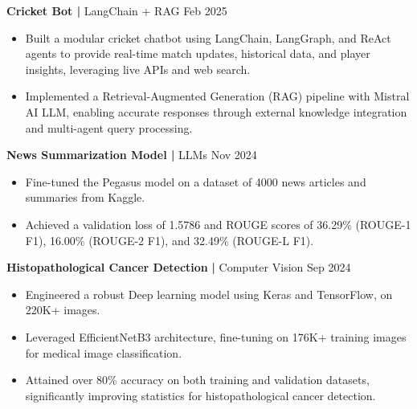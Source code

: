\documentclass{article}
\begin{document}
{{%
 \large { \bf {Cricket Bot}{ \href{https://github.com/AnshulBuxy/CrickBot}{\faGithub}}} \textbf{|} LangChain + RAG\hspace*{\fill} { Feb 2025} \par 
\vspace{-2mm}
\normalsize\begin{itemize}[noitemsep]
 \item Built a modular cricket chatbot using LangChain, LangGraph, and ReAct agents to provide real-time match updates, historical data, and player insights, leveraging live APIs and web search.
 \item Implemented a Retrieval-Augmented Generation (RAG) pipeline with Mistral AI LLM, enabling accurate responses through external knowledge integration and multi-agent query processing.
 \end{itemize}
\vspace{-2mm}
\large { \bf {News Summarization Model  }{\href{https://github.com/AnshulBuxy/News-Summarization-Model}{\faGithub}}} \textbf{|} LLMs\hspace*{\fill} {Nov 2024} \par 
\vspace{-2mm}
\normalsize\begin{itemize}[noitemsep]
 \item Fine-tuned the Pegasus model on a dataset of 4000 news articles and summaries from Kaggle.
 \item Achieved a validation loss of 1.5786 and ROUGE scores of 36.29\% (ROUGE-1 F1), 16.00\% (ROUGE-2 F1), and 32.49\% (ROUGE-L F1). 
 \end{itemize}
 \vspace{-2mm}
 \large { \bf {Histopathological Cancer Detection}{\href{https://github.com/AnshulBuxy/Histopathological-Cancer-Detection}{\faGithub}}} \textbf{|} Computer Vision\hspace*{\fill} { Sep 2024} \par 
\vspace{-2mm}
\normalsize\begin{itemize}[noitemsep]
 \item Engineered a robust Deep learning model using Keras and TensorFlow, on 220K+ images.
 \item Leveraged EfficientNetB3 architecture, fine-tuning on 176K+ training images for medical image classification.
 \item Attained over 80\% accuracy on both training and validation datasets, significantly improving statistics for
 histopathological cancer detection.
 \end{itemize}

}}
\end{document}
